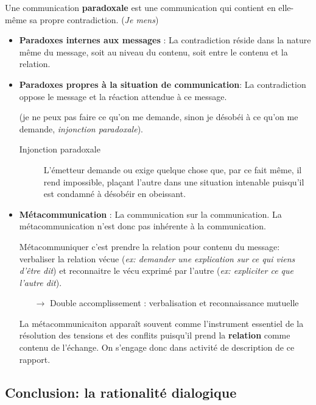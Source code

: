 \documentclass[11pt]{article} %
\begin{document}
Une communication \textbf{paradoxale} est une communication qui contient
en elle-même sa propre contradiction. (\textit{Je mens})

\begin{itemize}

    \item \textbf{Paradoxes internes aux messages} : La contradiction
    réside dans la nature même du message, soit au niveau du contenu,
    soit entre le contenu et la relation.

    \item \textbf{Paradoxes propres à la situation de communication}:
    La contradiction oppose le message et la réaction attendue à
    ce message.
    
    (je ne peux pas faire ce qu'on me demande, sinon je
    désobéi à ce qu'on me demande, \textit{injonction paradoxale}).

\begin{description}

\item[Injonction paradoxale] L'émetteur demande ou exige quelque chose
que, par ce fait même, il rend impossible, plaçant l'autre dans une
situation intenable puisqu'il est condamné à désobéir en obeissant.

\end{description}

\item \textbf{Métacommunication} : La communication sur la communication.
La métacommunication n'est donc pas inhérente à la communication.

Métacommuniquer c'est prendre la relation pour contenu du message:
verbaliser la relation vécue (\textit{ex: demander une explication sur
ce qui viens d'être dit}) et reconnaitre le vécu exprimé par l'autre
(\textit{ex: expliciter ce que l'autre dit}).
\begin{itemize}
    \item[$\to$] Double accomplissement : verbalisation et
        reconnaissance mutuelle
\end{itemize}


La métacommunicaiton apparaît souvent comme l'instrument essentiel de la
résolution des tensions et des conflits puisqu'il prend la
\textbf{relation} comme contenu de l'échange. On s'engage donc dans
activité de description de ce rapport.

\end{itemize}


\subsection{Conclusion: la rationalité dialogique}
\end{document}
